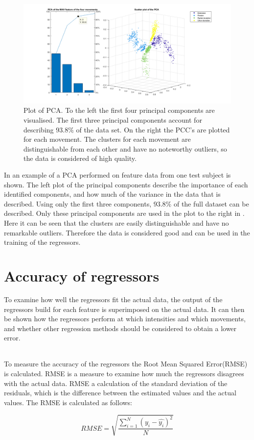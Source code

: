 \begin{figure}[H]
	\includegraphics[width=.4\textwidth]{figures/Methods/pcasubplot.png} 
	\caption{Plot of PCA. To the left the first four principal components are visualised. The first three principal components account for describing $93.8\%$ of the data set. On the right the PCC's are plotted for each movement. The clusters for each movement are distinguishable from each other and have no noteworthy outliers, so the data is considered of high quality.} 
	\label{fig:pcasubplot}
\end{figure} 

In  an example of a PCA performed on feature data from one test subject is shown. The left plot of the principal components describe the importance of each identified components, and how much of the variance in the data that is described. Using only the first three components, $93.8\%$ of the full dataset can be described. Only these principal components are used in the plot to the right in . Here it can be seen that the clusters are easily distinguishable and have no remarkable outliers. Therefore the data is considered good and can be used in the training of the regressors.


\section{Accuracy of regressors}
To examine how well the regressors fit the actual data, the output of the regressors build for each feature is superimposed on the actual data. It can then be shown how the regressors perform at which intensities and which movements, and whether other regression methods should be considered to obtain a lower error. 

\\
To measure the accuracy of the regressors the Root Mean Squared Error(RMSE) is calculated. RMSE is a measure to examine how much the regressors disagrees with the actual data. RMSE a calculation of the standard deviation of the residuals, which is the difference between the estimated values and the actual values. The RMSE is calculated as follows:

\begin{equation}
RMSE = \sqrt{\frac{\sum\limits_{i=1}^N(y_i - \hat{y_i})^2}{N}}
\end{equation}

